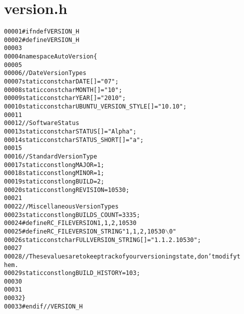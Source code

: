 \hypertarget{version_8h_source}{
\section{version.h}
}


\begin{footnotesize}\begin{alltt}
00001 \textcolor{preprocessor}{#ifndef VERSION\_H}
00002 \textcolor{preprocessor}{}\textcolor{preprocessor}{#define VERSION\_H}
00003 \textcolor{preprocessor}{}
00004 \textcolor{keyword}{namespace }AutoVersion\{
00005         
00006         \textcolor{comment}{//Date Version Types}
00007         \textcolor{keyword}{static} \textcolor{keyword}{const} \textcolor{keywordtype}{char} DATE[] = \textcolor{stringliteral}{"07"};
00008         \textcolor{keyword}{static} \textcolor{keyword}{const} \textcolor{keywordtype}{char} MONTH[] = \textcolor{stringliteral}{"10"};
00009         \textcolor{keyword}{static} \textcolor{keyword}{const} \textcolor{keywordtype}{char} YEAR[] = \textcolor{stringliteral}{"2010"};
00010         \textcolor{keyword}{static} \textcolor{keyword}{const} \textcolor{keywordtype}{char} UBUNTU\_VERSION\_STYLE[] = \textcolor{stringliteral}{"10.10"};
00011         
00012         \textcolor{comment}{//Software Status}
00013         \textcolor{keyword}{static} \textcolor{keyword}{const} \textcolor{keywordtype}{char} STATUS[] = \textcolor{stringliteral}{"Alpha"};
00014         \textcolor{keyword}{static} \textcolor{keyword}{const} \textcolor{keywordtype}{char} STATUS\_SHORT[] = \textcolor{stringliteral}{"a"};
00015         
00016         \textcolor{comment}{//Standard Version Type}
00017         \textcolor{keyword}{static} \textcolor{keyword}{const} \textcolor{keywordtype}{long} MAJOR = 1;
00018         \textcolor{keyword}{static} \textcolor{keyword}{const} \textcolor{keywordtype}{long} MINOR = 1;
00019         \textcolor{keyword}{static} \textcolor{keyword}{const} \textcolor{keywordtype}{long} BUILD = 2;
00020         \textcolor{keyword}{static} \textcolor{keyword}{const} \textcolor{keywordtype}{long} REVISION = 10530;
00021         
00022         \textcolor{comment}{//Miscellaneous Version Types}
00023         \textcolor{keyword}{static} \textcolor{keyword}{const} \textcolor{keywordtype}{long} BUILDS\_COUNT = 3335;
00024 \textcolor{preprocessor}{        #define RC\_FILEVERSION 1,1,2,10530}
00025 \textcolor{preprocessor}{}\textcolor{preprocessor}{        #define RC\_FILEVERSION\_STRING "1, 1, 2, 10530\(\backslash\)0"}
00026 \textcolor{preprocessor}{}        \textcolor{keyword}{static} \textcolor{keyword}{const} \textcolor{keywordtype}{char} FULLVERSION\_STRING[] = \textcolor{stringliteral}{"1.1.2.10530"};
00027         
00028         \textcolor{comment}{//These values are to keep track of your versioning state, don't modify t
      hem.}
00029         \textcolor{keyword}{static} \textcolor{keyword}{const} \textcolor{keywordtype}{long} BUILD\_HISTORY = 103;
00030         
00031 
00032 \}
00033 \textcolor{preprocessor}{#endif //VERSION\_H}
\end{alltt}\end{footnotesize}
